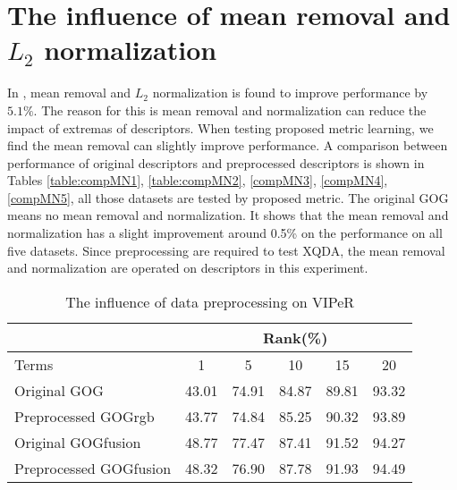 \section{The influence of mean removal and $L_2$ normalization}
In \cite{GOG}, mean removal and $L_2$  normalization is found to improve performance by $5.1\%$. The reason for this is mean removal and normalization can reduce the impact of extremas of descriptors. When testing proposed metric learning, we find the mean removal can slightly improve performance. A comparison between performance of original descriptors and preprocessed descriptors is shown in Tables \ref{table:compMN1}, \ref{table:compMN2}, \ref{compMN3}, \ref{compMN4}, \ref{compMN5}, all those datasets are tested by proposed metric. The original GOG means no mean removal and normalization. It shows that the mean removal and normalization has a slight improvement around 0.5\% on the performance on all five datasets. Since preprocessing are required to test XQDA, the mean removal and normalization are operated on descriptors in this experiment. 

\begin{table}[H]
\centering
\caption{The influence of data preprocessing on VIPeR}
\begin{tabular}{|l|c|c|c|c|c|}
\hline
 & \multicolumn{5}{|c|}{Rank(\%)} \\
 \hline
Terms  &1 &5 & 10 &15& 20\\
\hline
Original GOG &43.01&74.91& 84.87& 89.81& 93.32 \\
\hline
Preprocessed GOGrgb &43.77&74.84&85.25& 90.32&93.89\\
 \hline
Original GOGfusion &48.77&77.47&87.41&91.52&94.27\\
\hline
Preprocessed GOGfusion &48.32&76.90&87.78&91.93& 94.49\\
 \hline

\end{tabular}
\end{table}
\label{table:compMN1}

